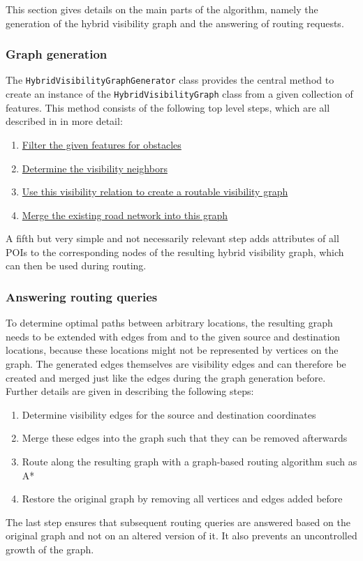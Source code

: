 		This section gives details on the main parts of the algorithm, namely the generation of the hybrid visibility graph and the answering of routing requests.
		
		\subsubsection{Graph generation}
		\label{subsubsec:graph-generation}
		
			The \texttt{HybridVisibilityGraphGenerator} class provides the central method to create an instance of the \texttt{HybridVisibilityGraph} class from a given collection of features.
			This method consists of the following top level steps, which are all described in  in more detail:
			\begin{enumerate}
				\item \hyperref[subsec:step-1-preprocessing]{Filter the given features for obstacles}
				\item \hyperref[subsec:step-2-knn-search]{Determine the visibility neighbors}
				\item \hyperref[subsec:step-3-graph-creation]{Use this visibility relation to create a routable visibility graph}
				\item \hyperref[subsec:step-4-graph merging]{Merge the existing road network into this graph}
			\end{enumerate}
			A fifth but very simple and not necessarily relevant step adds attributes of all POIs to the corresponding nodes of the resulting hybrid visibility graph, which can then be used during routing.
		
		\subsubsection{Answering routing queries}
		
			To determine optimal paths between arbitrary locations, the resulting graph needs to be extended with edges from and to the given source and destination locations, because these locations might not be represented by vertices on the graph.
			The generated edges themselves are visibility edges and can therefore be created and merged just like the edges during the graph generation before.
			Further details are given in  describing the following steps:
			\begin{enumerate}
				\item Determine visibility edges for the source and destination coordinates
				\item Merge these edges into the graph such that they can be removed afterwards
				\item Route along the resulting graph with a graph-based routing algorithm such as A*
				\item Restore the original graph by removing all vertices and edges added before
			\end{enumerate}
			The last step ensures that subsequent routing queries are answered based on the original graph and not on an altered version of it.
			It also prevents an uncontrolled growth of the graph.
	
